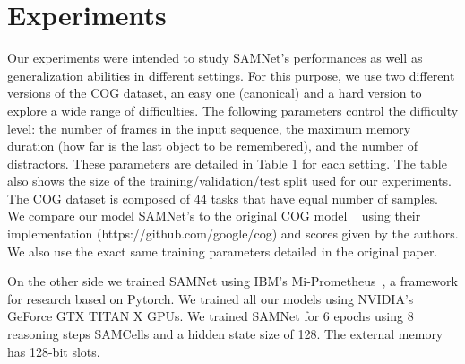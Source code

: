 \section{Experiments}

Our experiments were intended to study SAMNet's performances as well as generalization abilities in different settings. For this purpose, we use two different versions of the COG dataset, an easy one (canonical) and a hard version to explore a wide range of difficulties. The following parameters control the difficulty level: the number of frames in the input sequence, the maximum memory duration (how far is the last object to be remembered), and the number of distractors. These parameters are detailed in Table 1 for each setting. The table also shows the size of the training/validation/test split used for our experiments. The COG dataset is composed of 44 tasks that have equal number of samples.
We compare our model SAMNet's to the original COG model  ~\cite{yang2018dataset} using their implementation (https://github.com/google/cog) and scores given by the authors. We also use the exact same training parameters detailed in the original paper.

On the other side we trained SAMNet using IBM's Mi-Prometheus~\cite{kornuta2018acceleratingo}, a framework for research based on Pytorch. We trained all our models using NVIDIA’s GeForce GTX TITAN X GPUs. We trained  SAMNet for 6 epochs using 8 reasoning steps SAMCells and a hidden state size of 128. The external memory has 128-bit slots.



